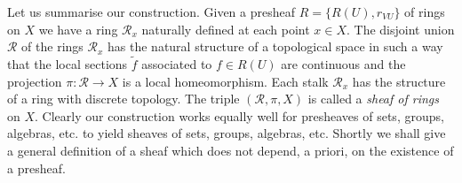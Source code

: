 Let us summarise our construction. Given a presheaf $R=\{R(U),r_{VU}\}$ of rings on $X$ we have a ring $\mathcal R_x$ naturally defined at each point $x\in X$. The disjoint union $\mathcal R$ of the rings $\mathcal R_x$ has the natural structure of a topological space in such a way that the local sections $\widetilde f$ associated to $f\in R(U)$ are continuous and the projection $\pi:\mathcal R\to X$ is a local homeomorphism. Each stalk $\mathcal R_x$ has the structure of a ring with discrete topology. The triple $(\mathcal R,\pi,X)$ is called a \emph{sheaf of rings} on $X$. Clearly our construction works equally well for presheaves of sets,
 groups, algebras, etc. to yield sheaves of sets, groups, algebras, etc. Shortly we shall give a general definition of a sheaf which does not depend, a priori, on the existence of a presheaf.

